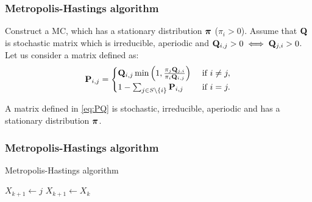 \begin{frame}
	\frametitle{Metropolis-Hastings algorithm}
	Construct a MC, which has a stationary distribution $\boldsymbol{\pi}$ ($\pi_i > 0$).
	Assume that $\mathbf{Q}$ is stochastic matrix which is irreducible, aperiodic and $\mathbf{Q}_{i,j} >0 \iff \mathbf{Q}_{j,i} > 0$. Let us consider a matrix defined as:
	\begin{equation} \label{eq:PQ}
	\mathbf{P}_{i,j} = 
	\begin{cases}
	\mathbf{Q}_{i,j} \min \left(1, \frac{\pi_j \mathbf{Q}_{j,i}}{\pi_i \mathbf{Q}_{i,j}}\right) & \text{ if } i \neq j, \\ 
	1 - \sum_{j \in S \setminus \left\{ i \right\} } \mathbf{P}_{i,j}& \text{ if } i = j.
	\end{cases}
	\end{equation} 
	
	\begin{theorem}
		A matrix defined in \ref{eq:PQ} is stochastic, irreducible, aperiodic and has a stationary distribution $\boldsymbol{\pi}$.
	\end{theorem}
\end{frame}

\begin{frame}
	\frametitle{Metropolis-Hastings algorithm}
	\begin{algorithm}[H]
		\caption{Metropolis-Hastings algorithm}\label{alg:metro-hast}
		\begin{algorithmic}[1]
			
			\State $X_{k+1} \gets j$
			\Else
			\State $X_{k+1} \gets X_k$
			\EndIf
			\EndFor
		\end{algorithmic}
	\end{algorithm}
\end{frame}